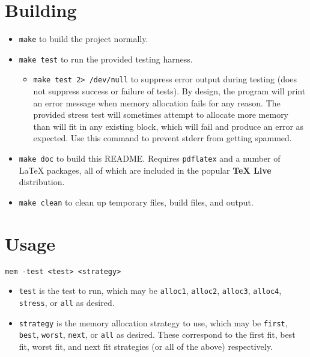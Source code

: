 \documentclass[paper=a4, fontsize=11pt]{scrartcl}
\begin{document}
\section*{Building}
\begin{itemize}
  \item \texttt{make} to build the project normally.

  \item \texttt{make test} to run the provided testing harness.
  \begin{itemize}
    \item \texttt{make test 2> /dev/null} to suppress error output during testing (does not suppress success or failure of tests). By design, the program will print an error message when memory allocation fails for any reason. The provided stress test will sometimes attempt to allocate more memory than will fit in any existing block, which will fail and produce an error as expected. Use this command to prevent stderr from getting spammed.
  \end{itemize}

  \item \texttt{make doc} to build this README. Requires \texttt{pdflatex} and a number of \LaTeX\hspace{0em} packages, all of which are included in the popular \textbf{TeX Live} distribution.

  \item \texttt{make clean} to clean up temporary files, build files, and output.
\end{itemize} 

\section*{Usage}
\texttt{mem -test <test> <strategy>}

\begin{itemize}
  \item \texttt{test} is the test to run, which may be \texttt{alloc1}, \texttt{alloc2}, \texttt{alloc3}, \texttt{alloc4}, \texttt{stress}, or \texttt{all} as desired.

  \item \texttt{strategy} is the memory allocation strategy to use, which may be \texttt{first}, \texttt{best}, \texttt{worst}, \texttt{next}, or \texttt{all} as desired. These correspond to the first fit, best fit, worst fit, and next fit strategies (or all of the above) respectively.
\end{itemize}
\end{document}
